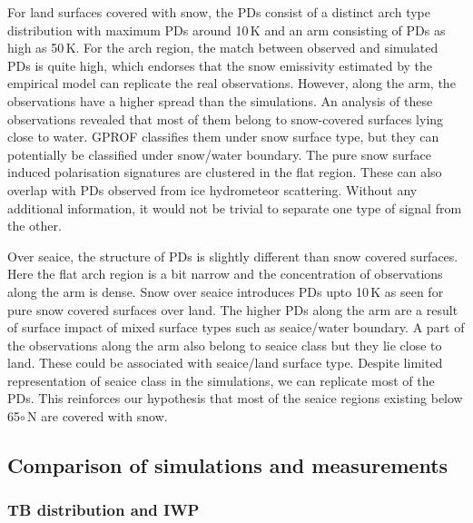 \documentclass[amt, manuscript]{copernicus}
\begin{document}
For land surfaces covered with snow, the PDs consist of a distinct arch type distribution with maximum PDs around 10\,K and an arm consisting of PDs as high as 50\,K. For the arch region, the match between observed and simulated PDs is quite high, which endorses that the snow emissivity estimated by the empirical model can replicate the real observations. However, along the arm, the observations have a higher spread than the simulations. An analysis of these observations revealed that most of them belong to snow-covered surfaces lying close to water. GPROF classifies them under snow surface type, but they can potentially be classified under snow/water boundary. The pure snow surface induced polarisation signatures are clustered in the flat region. These can also overlap with PDs observed from ice hydrometeor scattering. Without any additional information, it would not be trivial to separate one type of signal from the other. 

Over seaice, the structure of PDs is slightly different than snow covered surfaces. Here the flat arch region is a bit narrow and the concentration of observations along the arm is dense. Snow over seaice introduces PDs upto 10\,K as seen for pure snow covered surfaces over land. The higher PDs along the arm are a result of surface impact of mixed surface types such as seaice/water boundary. A part of the observations along the arm also belong to seaice class but they lie close to land. These could be associated with seaice/land surface type. Despite limited representation of seaice class in the simulations, we can replicate most of the PDs. This reinforces our hypothesis that most of the seaice regions existing below 65$\circ$\,N are covered with snow. 


\subsection{Comparison of simulations and measurements}
\label{sec:comparison_sim_obs}
\subsubsection{TB distribution and IWP}
\end{document}
